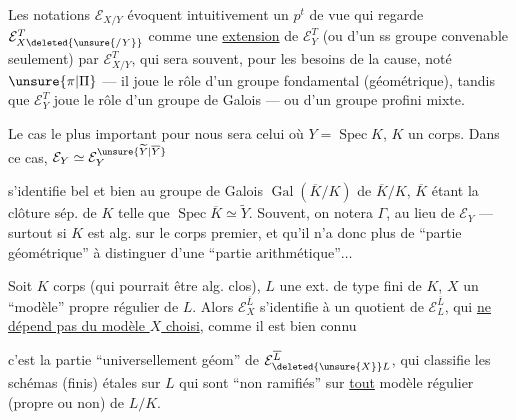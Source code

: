 Les notations  $\mathcal E_{X/Y}$ évoquent
intuitivement un $p^t$ de vue qui
regarde $\mathcal E_{X\deleted{\unsure{/Y}}}^T$ comme une \uline{extension}
de $\mathcal E_Y^T$ (ou d'un ss groupe
convenable seulement) par $\mathcal E_{X/Y}^T$,
qui sera souvent, pour les besoins de
la cause, noté $\unsure{\pi|\Pi}$ --- il joue le
rôle d'un groupe fondamental
(géométrique), tandis que $\mathcal E_Y^T$ joue
le rôle d'un groupe de Galois ---
ou d'un groupe profini mixte.


Le cas le plus important pour nous
sera celui où $Y=\operatorname{Spec}K$, $K$ un corps.
 Dans ce cas, $\mathcal E_Y\simeq\mathcal E_Y^{\unsure{\widetilde Y|\overline Y}}$



s'identifie bel et bien au groupe
de Galois $\operatorname{Gal}(\overline K/K)$ de  $\overline K/K$,
$\overline K$ étant la clôture sép. de $K$ telle que
$\operatorname{Spec}\overline K\simeq\widetilde Y$. Souvent, on notera
$\Gamma$,  au lieu de $\mathcal E_Y$ --- surtout
si $K$ est alg. sur le corps premier,
et qu'il n'a donc plus de ``partie
géométrique'' à distinguer d'une
``partie arithmétique''$\ldots$

Soit  $K$  corps (qui pourrait
être alg. clos), $L$ une ext. de
type fini de $K$, $X$ un ``modèle''
propre régulier de $L$. Alors
$\mathcal E_X^{\overline L}$ s'identifie à un quotient de $\mathcal E_L^{\overline L}$,
qui \uline{ne  dépend pas du modèle
$X$ choisi}, comme il est bien connu



c'est la partie ``universellement géom'' de $\mathcal E_{\deleted{\unsure{X}}L}^{\overline L}$,    qui classifie les schémas (finis) étales sur $L$ qui sont ``non ramifiés'' sur \uline{tout} modèle  régulier (propre ou non) de $L/K$.

